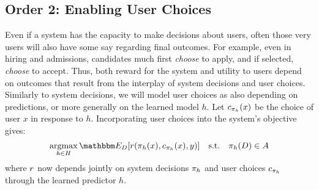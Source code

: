  

 
\subsection{Order 2: Enabling User Choices} \label{sec:order2}
Even if a system has the capacity to make decisions about users,
often those very users will also have some say regarding final outcomes.
For example, even in hiring and admissions,
candidates much first \emph{choose} to apply, and if selected, \emph{choose} to accept.
Thus, both reward for the system and utility to users depend on outcomes that result from the interplay of system decisions and user choices.
Similarly to system decisions, we will model user choices as also depending on predictions, or more generally on the learned model $h$.
Let ${c}_{{\pi}_h}(x)$ be the choice of user $x$ in response to $h$.
Incorporating user choices into the system's objective gives:
\squeeze
\begin{equation}
\label{eq:order2_objective}
\argmax_{h \in H} \expect{\dist}{\reward(\policy_h(x),\choice_{\policy_h}(x),y)}
\quad \text{s.t.} \quad
\policy_h(\dist) \in A
\end{equation}
where ${r}$ now depends jointly on system decisions ${\pi}_h$
and user choices ${c}_{{\pi}_h}$ through the learned predictor $h$.

